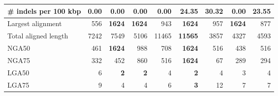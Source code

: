 \documentclass[12pt,a4paper]{article}
\begin{document}
\begin{table}[ht]
\begin{center}
\begin{tabular}{|l*{8}{|r}|}
\# indels per 100 kbp & {\bf 0.00} & {\bf 0.00} & {\bf 0.00} & {\bf 0.00} & 24.35 & 30.32 & {\bf 0.00} & 23.55 \\ \hline
Largest alignment & 556 & {\bf 1624} & {\bf 1624} & 943 & {\bf 1624} & 957 & {\bf 1624} & 877 \\ \hline
Total aligned length & 7242 & 7549 & 5106 & 11465 & {\bf 11565} & 3857 & 4327 & 4593 \\ \hline
NGA50 & 461 & {\bf 1624} & 988 & 708 & {\bf 1624} & 516 & 438 & 516 \\ \hline
NGA75 & 332 & 452 & 860 & 516 & {\bf 1624} & 67 & 289 & 294 \\ \hline
LGA50 & 6 & {\bf 2} & {\bf 2} & 4 & {\bf 2} & 4 & 3 & 4 \\ \hline
LGA75 & 9 & 4 & 4 & 6 & {\bf 3} & 12 & 7 & 7 \\ \hline
\end{tabular}
\end{center}
\end{table}
\end{document}

